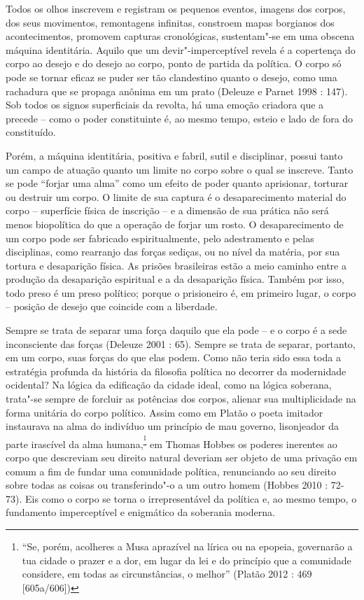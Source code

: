Todos os olhos inscrevem e
registram os pequenos eventos, imagens dos corpos, dos seus movimentos,
remontagens infinitas, constroem mapas borgianos dos acontecimentos,
promovem capturas cronológicas, sustentam"-se em uma obscena máquina
identitária. Aquilo que um devir"-imperceptível revela é a copertença do
corpo ao desejo e do desejo ao corpo, ponto de partida da política. O
corpo só pode se tornar eficaz se puder ser tão clandestino quanto o
desejo, como uma rachadura que se propaga anônima em um prato (Deleuze e
Parnet 1998 : 147). Sob todos os signos superficiais da revolta, há uma
emoção criadora que a precede -- como o poder constituinte é, ao mesmo
tempo, esteio e lado de fora do constituído.

Porém, a máquina identitária, positiva e fabril, sutil e disciplinar,
possui tanto um campo de atuação quanto um limite no corpo sobre o qual
se inscreve. Tanto se pode ``forjar uma alma'' como um efeito de poder
quanto aprisionar, torturar ou destruir um corpo. O limite de sua
captura é o desaparecimento material do corpo -- superfície física de
inscrição -- e a dimensão de sua prática não será menos biopolítica do
que a operação de forjar um rosto. O desaparecimento de um corpo pode
ser fabricado espiritualmente, pelo adestramento e pelas disciplinas,
como rearranjo das forças sediças, ou no nível da matéria, por sua
tortura e desaparição física. As prisões brasileiras estão a meio
caminho entre a produção da desaparição espiritual e a da desaparição
física. Também por isso, todo preso é um preso político; porque o
prisioneiro é, em primeiro lugar, o corpo -- posição de desejo que
coincide com a liberdade.

Sempre se trata de separar uma força daquilo que ela pode -- e o corpo é
a sede inconsciente das forças (Deleuze 2001 : 65). Sempre se trata de
separar, portanto, em um corpo, suas forças do que elas podem. Como não
teria sido essa toda a estratégia profunda da história da filosofia
política no decorrer da modernidade ocidental? Na lógica da edificação
da cidade ideal, como na lógica soberana, trata"-se sempre de forcluir as
potências dos corpos, alienar sua multiplicidade na forma unitária do
corpo político. Assim como em Platão o poeta imitador instaurava na alma
do indivíduo um princípio de mau governo, lisonjeador da parte irascível
da alma humana,\textsuperscript{\footnote{``Se, porém, acolheres a Musa
  aprazível na lírica ou na epopeia, governarão a tua cidade o prazer e
  a dor, em lugar da lei e do princípio que a comunidade considere, em
  todas as circunstâncias, o melhor'' (Platão 2012 : 469 {[}605a/606{]})}}
em Thomas Hobbes os poderes inerentes ao corpo que descreviam seu
direito natural deveriam ser objeto de uma privação em comum a fim de
fundar uma comunidade política, renunciando ao seu direito sobre todas
as coisas ou transferindo"-o a um outro homem (Hobbes 2010 : 72-73). Eis
como o corpo se torna o irrepresentável da política e, ao mesmo tempo, o
fundamento imperceptível e enigmático da soberania moderna.

